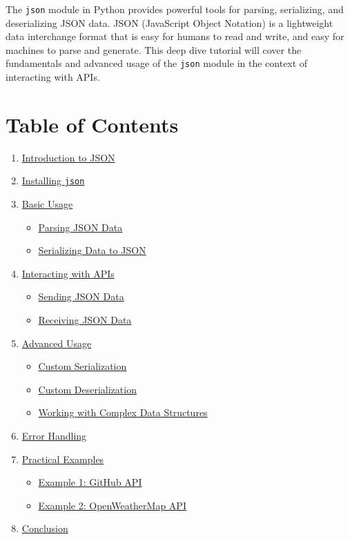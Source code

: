 \documentclass[
  letterpaper,
  DIV=11,
  numbers=noendperiod]{scrreprt}
\providecommand{\tightlist}{%
  \setlength{\itemsep}{0pt}\setlength{\parskip}{0pt}}\usepackage{longtable,booktabs,array}
\begin{document}
The \texttt{json} module in Python provides powerful tools for parsing,
serializing, and deserializing JSON data. JSON (JavaScript Object
Notation) is a lightweight data interchange format that is easy for
humans to read and write, and easy for machines to parse and generate.
This deep dive tutorial will cover the fundamentals and advanced usage
of the \texttt{json} module in the context of interacting with APIs.

\section{Table of Contents}\label{table-of-contents-9}

\begin{enumerate}
\def\labelenumi{\arabic{enumi}.}
\tightlist
\item
  \hyperref[introduction-to-json]{Introduction to JSON}
\item
  \hyperref[installing-json]{Installing \texttt{json}}
\item
  \hyperref[basic-usage]{Basic Usage}

  \begin{itemize}
  \tightlist
  \item
    \hyperref[parsing-json-data]{Parsing JSON Data}
  \item
    \hyperref[serializing-data-to-json]{Serializing Data to JSON}
  \end{itemize}
\item
  \hyperref[interacting-with-apis]{Interacting with APIs}

  \begin{itemize}
  \tightlist
  \item
    \hyperref[sending-json-data]{Sending JSON Data}
  \item
    \hyperref[receiving-json-data]{Receiving JSON Data}
  \end{itemize}
\item
  \hyperref[advanced-usage]{Advanced Usage}

  \begin{itemize}
  \tightlist
  \item
    \hyperref[custom-serialization]{Custom Serialization}
  \item
    \hyperref[custom-deserialization]{Custom Deserialization}
  \item
    \hyperref[working-with-complex-data-structures]{Working with Complex
    Data Structures}
  \end{itemize}
\item
  \hyperref[error-handling]{Error Handling}
\item
  \hyperref[practical-examples]{Practical Examples}

  \begin{itemize}
  \tightlist
  \item
    \hyperref[example-1-github-api]{Example 1: GitHub API}
  \item
    \hyperref[example-2-openweathermap-api]{Example 2: OpenWeatherMap
    API}
  \end{itemize}
\item
  \hyperref[conclusion]{Conclusion}
\end{enumerate}
\end{document}
